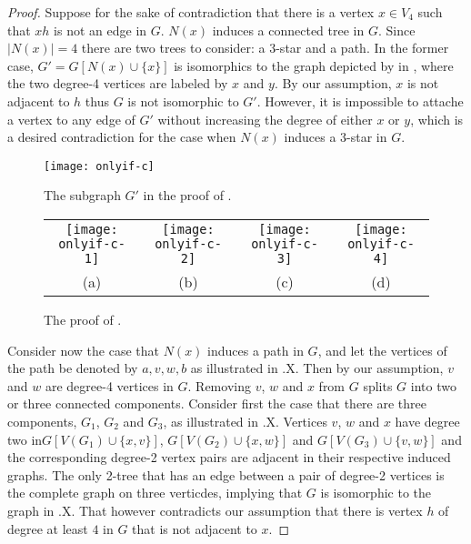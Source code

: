 \documentclass[lotsofwhite,charterfonts]{patmorin}
\begin{document}
\begin{proof}
Suppose for the sake of contradiction that there is a vertex $x\in
V_4$ such that $xh$ is not an edge in $G$. $N(x)$ induces a connected
tree in $G$. Since $|N(x)|=4$ there are two trees to consider: a
3-star and a path. In the former case, $G'=G[N(x)\cup \{x\}]$ is
isomorphics to the graph depicted by in , where the two
degree-4 vertices are labeled by $x$ and $y$. By our assumption, $x$
is not adjacent to $h$ thus $G$ is not isomorphic to $G'$. However, it
is impossible to attache a vertex to any edge of $G'$ without
increasing the degree of either $x$ or $y$, which is a desired
contradiction for the case when $N(x)$ induces a 3-star in $G$.
\begin{figure}
\begin{center}\texttt{[image: onlyif-c]}\end{center}
\caption{The subgraph $G'$ in the proof of .}
\end{figure}
\begin{figure}
\begin{center}\begin{tabular}{cccc}
\texttt{[image: onlyif-c-1]} &
\texttt{[image: onlyif-c-2]} &
\texttt{[image: onlyif-c-3]} &
\texttt{[image: onlyif-c-4]} \\
(a) & (b) & (c) & (d)
\end{tabular}\end{center}
\caption{The proof of .}
\end{figure}
Consider now the case that $N(x)$ induces a path in $G$, and let the
vertices of the path be denoted by $a,v,w,b$ as illustrated in
.X. Then by our assumption, $v$ and $w$ are degree-4
vertices in $G$. Removing $v$, $w$ and $x$ from $G$ splits $G$ into
two or three connected components. Consider first the case that there
are three components, $G_1$, $G_2$ and $G_3$, as illustrated in
.X. Vertices $v$, $w$ and $x$ have degree two
in$G[V(G_1)\cup \{x,v\}]$, $G[V(G_2)\cup \{x,w\}]$  and $G[V(G_3)\cup
\{v,w\}]$ and the corresponding degree-2 vertex pairs are adjacent in
their respective induced graphs. The only 2-tree that has an edge
between a pair of degree-2 vertices is the complete graph on three
verticdes, implying that $G$ is isomorphic to the graph in
.X. That however contradicts our assumption that there is
vertex $h$ of degree at least $4$ in $G$ that is not adjacent to $x$.


\end{proof}
\end{document}
